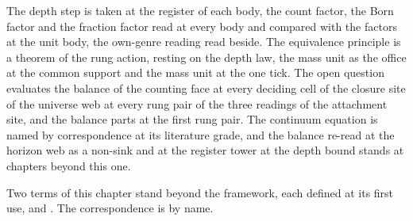The depth step is taken at the register of each body, the count factor, the Born factor and the fraction factor read at every body and compared with the factors at the unit body, the own-genre reading read beside. The equivalence principle is a theorem of the rung action, resting on the depth law, the mass unit as the office at the common support and the mass unit at the one tick. The open question evaluates the balance of the counting face at every deciding cell of the closure site of the universe web at every rung pair of the three readings of the attachment site, and the balance parts at the first rung pair. The continuum equation is named by correspondence at its literature grade, and the balance re-read at the horizon web as a non-sink and at the register tower at the depth bound stands at chapters beyond this one.
\begin{chbridge}
Two terms of this chapter stand beyond the framework, each defined at its first use,  and . The correspondence is by name.
\end{chbridge}
